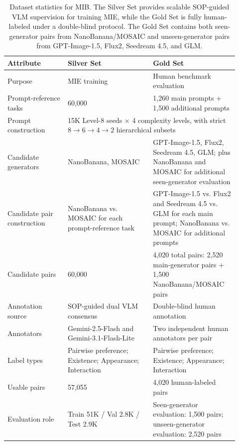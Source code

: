\begin{table}[t]
\centering
\small
\begin{tabular}{p{0.24\linewidth}p{0.34\linewidth}p{0.34\linewidth}}
\toprule
\textbf{Attribute} & \textbf{Silver Set} & \textbf{Gold Set} \\
\midrule
Purpose 
& MIE training 
& Human benchmark evaluation \\

Prompt-reference tasks 
& 60,000 
& 1,260 main prompts + 1,500 additional prompts \\

Prompt construction 
& \multicolumn{2}{p{0.72\linewidth}}{15K Level-8 seeds $\times$ 4 complexity levels, with strict $8 \rightarrow 6 \rightarrow 4 \rightarrow 2$ hierarchical subsets} \\

Candidate generators 
& NanoBanana, MOSAIC 
& GPT-Image-1.5, Flux2, Seedream 4.5, GLM; plus NanoBanana and MOSAIC for additional seen-generator evaluation \\

Candidate pair construction 
& NanoBanana vs. MOSAIC for each prompt-reference task 
& GPT-Image-1.5 vs. Flux2 and Seedream 4.5 vs. GLM for each main prompt; NanoBanana vs. MOSAIC for additional prompts \\

Candidate pairs 
& 60,000 
& 4,020 total pairs: 2,520 main-generator pairs + 1,500 NanoBanana/MOSAIC pairs \\

Annotation source 
& SOP-guided dual VLM consensus 
& Double-blind human annotation \\

Annotators 
& Gemini-2.5-Flash and Gemini-3.1-Flash-Lite 
& Two independent human annotators per pair \\

Label types 
& Pairwise preference; Existence; Appearance; Interaction 
& Pairwise preference; Existence; Appearance; Interaction \\

Usable pairs 
& 57,055 
& 4,020 human-labeled pairs \\

Evaluation role 
& Train 51K / Val 2.8K / Test 2.9K 
& Seen-generator evaluation: 1,500 pairs; unseen-generator evaluation: 2,520 pairs \\
\bottomrule
\end{tabular}
\caption{Dataset statistics for MIB. The Silver Set provides scalable SOP-guided VLM supervision for training MIE, while the Gold Set is fully human-labeled under a double-blind protocol. The Gold Set contains both seen-generator pairs from NanoBanana/MOSAIC and unseen-generator pairs from GPT-Image-1.5, Flux2, Seedream 4.5, and GLM.}
\label{tab:dataset_statistics}
\end{table}



